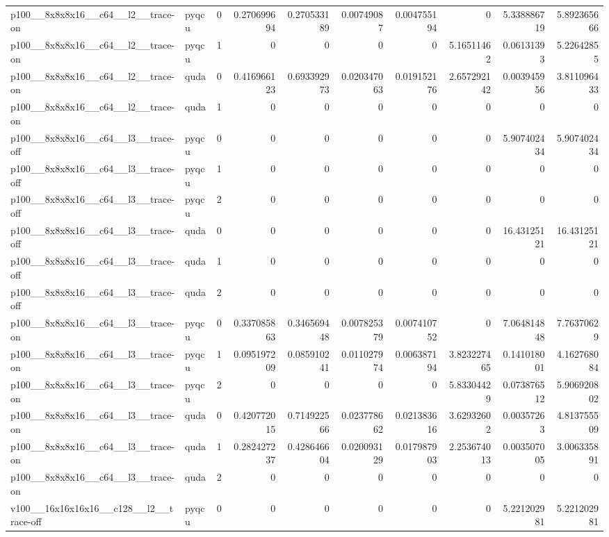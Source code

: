 \begin{table}[htbp]
\begin{tabular}{@{}llrrrrrrrr@{}}
p100\_\_8x8x8x16\_\_c64\_\_l2\_\_trace-on & pyqcu & 0 & 0.270699694 & 0.270533189 & 0.00749087 & 0.004755194 & 0 & 5.338886719 & 5.892365666 \\
p100\_\_8x8x8x16\_\_c64\_\_l2\_\_trace-on & pyqcu & 1 & 0 & 0 & 0 & 0 & 5.16511462 & 0.06131393 & 5.22642855 \\
p100\_\_8x8x8x16\_\_c64\_\_l2\_\_trace-on & quda & 0 & 0.416966123 & 0.693392973 & 0.020347063 & 0.019152176 & 2.657292142 & 0.003945956 & 3.811096433 \\
p100\_\_8x8x8x16\_\_c64\_\_l2\_\_trace-on & quda & 1 & 0 & 0 & 0 & 0 & 0 & 0 & 0 \\
p100\_\_8x8x8x16\_\_c64\_\_l3\_\_trace-off & pyqcu & 0 & 0 & 0 & 0 & 0 & 0 & 5.907402434 & 5.907402434 \\
p100\_\_8x8x8x16\_\_c64\_\_l3\_\_trace-off & pyqcu & 1 & 0 & 0 & 0 & 0 & 0 & 0 & 0 \\
p100\_\_8x8x8x16\_\_c64\_\_l3\_\_trace-off & pyqcu & 2 & 0 & 0 & 0 & 0 & 0 & 0 & 0 \\
p100\_\_8x8x8x16\_\_c64\_\_l3\_\_trace-off & quda & 0 & 0 & 0 & 0 & 0 & 0 & 16.43125121 & 16.43125121 \\
p100\_\_8x8x8x16\_\_c64\_\_l3\_\_trace-off & quda & 1 & 0 & 0 & 0 & 0 & 0 & 0 & 0 \\
p100\_\_8x8x8x16\_\_c64\_\_l3\_\_trace-off & quda & 2 & 0 & 0 & 0 & 0 & 0 & 0 & 0 \\
p100\_\_8x8x8x16\_\_c64\_\_l3\_\_trace-on & pyqcu & 0 & 0.337085863 & 0.346569448 & 0.007825379 & 0.007410752 & 0 & 7.064814848 & 7.76370629 \\
p100\_\_8x8x8x16\_\_c64\_\_l3\_\_trace-on & pyqcu & 1 & 0.095197209 & 0.085910241 & 0.011027974 & 0.006387194 & 3.823227465 & 0.141018001 & 4.162768084 \\
p100\_\_8x8x8x16\_\_c64\_\_l3\_\_trace-on & pyqcu & 2 & 0 & 0 & 0 & 0 & 5.83304429 & 0.073876512 & 5.906920802 \\
p100\_\_8x8x8x16\_\_c64\_\_l3\_\_trace-on & quda & 0 & 0.420772015 & 0.714922566 & 0.023778662 & 0.021383616 & 3.62932602 & 0.00357263 & 4.813755509 \\
p100\_\_8x8x8x16\_\_c64\_\_l3\_\_trace-on & quda & 1 & 0.282427237 & 0.428646604 & 0.020093129 & 0.017987903 & 2.253674013 & 0.003507005 & 3.006335891 \\
p100\_\_8x8x8x16\_\_c64\_\_l3\_\_trace-on & quda & 2 & 0 & 0 & 0 & 0 & 0 & 0 & 0 \\
v100\_\_16x16x16x16\_\_c128\_\_l2\_\_trace-off & pyqcu & 0 & 0 & 0 & 0 & 0 & 0 & 5.221202981 & 5.221202981 \\

\end{tabular}
\end{table}
